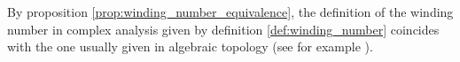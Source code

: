 \begin{remark}
By proposition \ref{prop:winding_number_equivalence}, the definition of the winding number in complex analysis given by definition \ref{def:winding_number} coincides with the one usually given in algebraic topology (see for example \cite[19--20]{fulton:algebraic_topology:1995}).
\end{remark}
